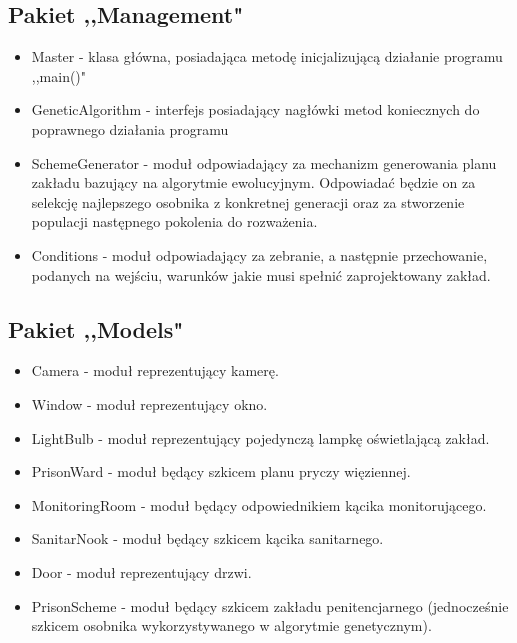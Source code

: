 \documentclass[10pt,oneside]{article}
\begin{document}
	\subsection{Pakiet ,,Management"}
	\begin{itemize}
		\item Master - klasa główna, posiadająca metodę inicjalizującą działanie programu ,,main()"
		\item GeneticAlgorithm - interfejs posiadający nagłówki metod koniecznych do poprawnego działania programu
		\item SchemeGenerator - moduł odpowiadający za mechanizm generowania planu zakładu bazujący na algorytmie ewolucyjnym. Odpowiadać będzie on za selekcję najlepszego osobnika z konkretnej generacji oraz za stworzenie populacji następnego pokolenia do rozważenia.
		\item Conditions - moduł odpowiadający za zebranie, a następnie przechowanie, podanych na wejściu, warunków jakie musi spełnić zaprojektowany zakład.
	\end{itemize}
	
	\subsection{Pakiet ,,Models"}
	\begin{itemize}
		\item Camera - moduł reprezentujący kamerę.
		\item Window - moduł reprezentujący okno.
		\item LightBulb - moduł reprezentujący pojedynczą lampkę oświetlającą zakład.
		\item PrisonWard - moduł będący szkicem planu pryczy więziennej.
		\item MonitoringRoom - moduł będący odpowiednikiem kącika monitorującego.
		\item SanitarNook - moduł będący szkicem kącika sanitarnego.
		\item Door - moduł reprezentujący drzwi.
		\item PrisonScheme - moduł będący szkicem zakładu penitencjarnego (jednocześnie szkicem osobnika wykorzystywanego w algorytmie genetycznym).
	\end{itemize}
	
\end{document}
